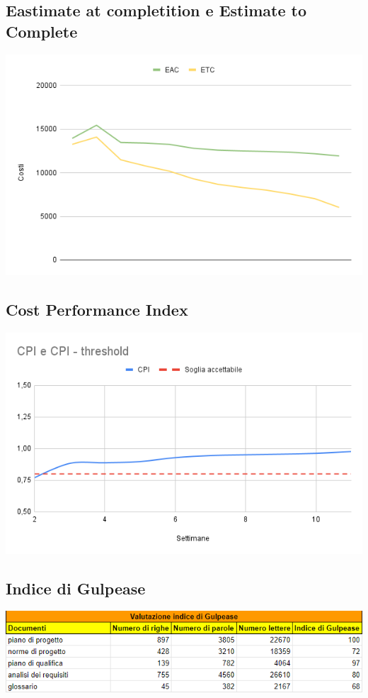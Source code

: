 \documentclass[12pt]{article}
\begin{document}
\subsection{Eastimate at completition e Estimate to Complete}
\begin{center}
	\includegraphics[scale=0.6]{EAC_ETC.png}
\end{center}
\subsection{Cost Performance Index}
\begin{center}
	\includegraphics[scale=0.6]{CPI.png}
\end{center}
\subsection{Indice di Gulpease}
\begin{center}
	\includegraphics[scale=0.8]{Gulpease.png}
\end{center}
\end{document}
